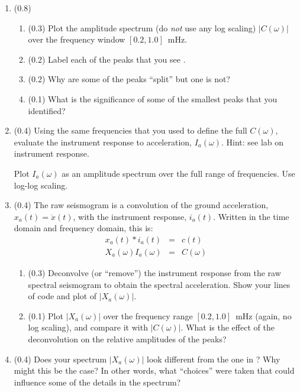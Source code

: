 \documentclass[11pt,titlepage,fleqn]{article}
\begin{document}
\begin{enumerate}

\item (0.8) 

\begin{enumerate}
\item (0.3) Plot the amplitude spectrum (do {\em not} use any log scaling) $|C(\omega)|$ over the frequency window $[0.2,1.0]$~mHz.
\item (0.2) Label each of the peaks that you see \citep[\eg][]{Park2005}.
\item (0.2) Why are some of the peaks ``split'' but one is not?
\item (0.1) What is the significance of some of the smallest peaks that you identified?
\end{enumerate}


\item (0.4) Using the same frequencies that you used to define the full $C(\omega)$, evaluate the instrument response to acceleration, $I_a(\omega)$. Hint: see lab on instrument response.

Plot $I_a(\omega)$ as an amplitude spectrum over the full range of frequencies. Use log-log scaling.


\item (0.4) The raw seismogram is a convolution of the ground acceleration, $x_a(t) = \ddot{x}(t)$, with the instrument response, $i_a(t)$. Written in the time domain and frequency domain, this is:
%
\begin{eqnarray}
x_a(t) * i_a(t) &=& c(t)
\\
X_a(\omega) I_a(\omega) &=& C(\omega)
\end{eqnarray}

\begin{enumerate}
\item (0.3) Deconvolve (or ``remove'') the instrument response from the raw spectral seismogram to obtain the spectral acceleration. Show your lines of code and plot of $|X_a(\omega)|$.
\item (0.1) Plot $|X_a(\omega)|$ over the frequency range $[0.2,1.0]$~mHz (again, no log scaling), and compare it with $|C(\omega)|$. What is the effect of the deconvolution on the relative amplitudes of the peaks?
\end{enumerate}


\item (0.4) Does your spectrum $|X_a(\omega)|$ look different from the one in \citet{Park2005}? Why might this be the case? In other words, what ``choices'' were taken that could influence some of the details in the spectrum?

\end{enumerate}
\end{document}

